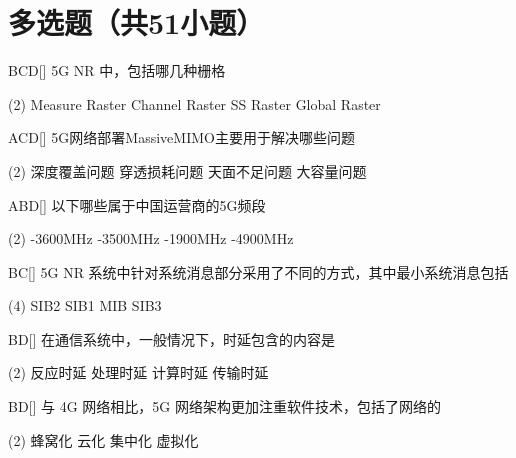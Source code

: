\section{多选题（共51小题）}

\begin{choice}{\;BCD\;}[]
    5G NR 中，包括哪几种栅格
    \begin{tasks}(2)
        \task Measure Raster
        \task Channel Raster
        \task SS Raster
        \task  Global Raster
    \end{tasks}
\end{choice}

\begin{choice}{\;ACD\;}[]
    5G网络部署Massive\;MIMO主要用于解决哪些问题
    \begin{tasks}(2)
        \task 深度覆盖问题
        \task 穿透损耗问题
        \task 天面不足问题
        \task 大容量问题
    \end{tasks}
\end{choice}

\begin{choice}{\;ABD\;}[]
    以下哪些属于中国运营商的5G频段
    \begin{tasks}(2)
        -3600MHz
        -3500MHz
        -1900MHz
        -4900MHz
    \end{tasks}
\end{choice}

\begin{choice}{\;BC\;}[]
    5G NR 系统中针对系统消息部分采用了不同的方式，其中最小系统消息包括
    \begin{tasks}(4)
        \task SIB2
        \task SIB1
        \task MIB
        \task SIB3
    \end{tasks}
\end{choice}


\begin{choice}{\;BD\;}[]
    在通信系统中，一般情况下，时延包含的内容是
    \begin{tasks}(2)
        \task 反应时延
        \task 处理时延
        \task 计算时延
        \task 传输时延
    \end{tasks}
\end{choice}

\begin{choice}{\;BD\;}[]
    与 4G 网络相比，5G 网络架构更加注重软件技术，包括了网络的
    \begin{tasks}(2)
        \task 蜂窝化
        \task 云化
        \task 集中化
        \task 虚拟化
    \end{tasks}
\end{choice}

